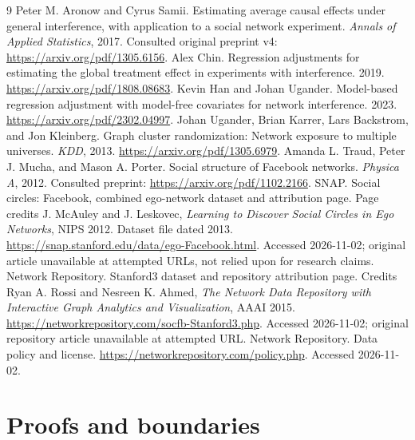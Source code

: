 \documentclass{article}
\begin{document}
\clearpage
\begin{thebibliography}{9}
 Peter M. Aronow and Cyrus Samii. Estimating average causal effects under general interference, with application to a social network experiment. \emph{Annals of Applied Statistics}, 2017. Consulted original preprint v4: \url{https://arxiv.org/pdf/1305.6156}.
 Alex Chin. Regression adjustments for estimating the global treatment effect in experiments with interference. 2019. \url{https://arxiv.org/pdf/1808.08683}.
 Kevin Han and Johan Ugander. Model-based regression adjustment with model-free covariates for network interference. 2023. \url{https://arxiv.org/pdf/2302.04997}.
 Johan Ugander, Brian Karrer, Lars Backstrom, and Jon Kleinberg. Graph cluster randomization: Network exposure to multiple universes. \emph{KDD}, 2013. \url{https://arxiv.org/pdf/1305.6979}.
 Amanda L. Traud, Peter J. Mucha, and Mason A. Porter. Social structure of Facebook networks. \emph{Physica A}, 2012. Consulted preprint: \url{https://arxiv.org/pdf/1102.2166}.
 SNAP. Social circles: Facebook, combined ego-network dataset and attribution page. Page credits J. McAuley and J. Leskovec, \emph{Learning to Discover Social Circles in Ego Networks}, NIPS 2012. Dataset file dated 2013. \url{https://snap.stanford.edu/data/ego-Facebook.html}. Accessed 2026-11-02; original article unavailable at attempted URLs, not relied upon for research claims.
 Network Repository. Stanford3 dataset and repository attribution page. Credits Ryan A. Rossi and Nesreen K. Ahmed, \emph{The Network Data Repository with Interactive Graph Analytics and Visualization}, AAAI 2015. \url{https://networkrepository.com/socfb-Stanford3.php}. Accessed 2026-11-02; original repository article unavailable at attempted URL.
 Network Repository. Data policy and license. \url{https://networkrepository.com/policy.php}. Accessed 2026-11-02.
\end{thebibliography}

\clearpage
\appendix
\section{Proofs and boundaries}\label{app:proof}
\end{document}
